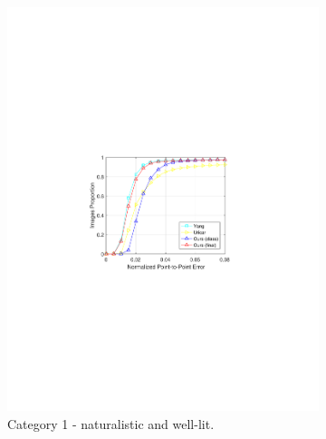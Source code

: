 \documentclass[letterpaper]{article} %
\begin{document}
\begin{figure}[t]
    \centering
    \begin{subfigure}[b]{0.3\textwidth}
        \centering
        \includegraphics[width=\textwidth]{fig/C1Curve.pdf}
            \caption{{\small Category 1 - naturalistic and well-lit.}}
        \end{subfigure}
        \qquad
        \begin{subfigure}[b]{0.3\textwidth}
            \centering

\end{subfigure}
\end{figure}
\end{document}

